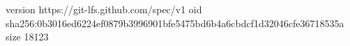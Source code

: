 version https://git-lfs.github.com/spec/v1
oid sha256:0b3016ed6224ef0879b3996901bfe5475bd6b4a6cbdcf1d32046cfe36718535a
size 18123
